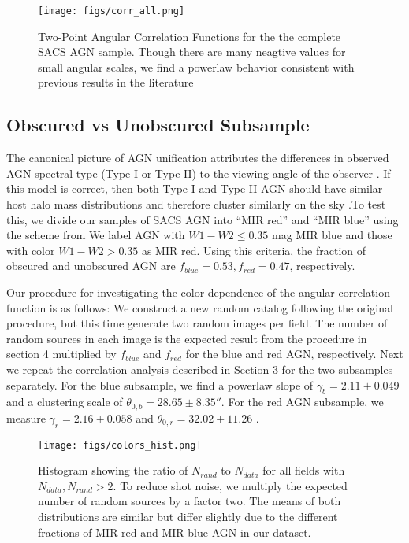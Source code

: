 \documentclass[preprint]{aastex63}
\begin{document}
\begin{figure}[!h]
    \centering
    \texttt{[image: figs/corr\_all.png]}
    \label{fig:corr_all}
    \caption{Two-Point Angular Correlation Functions for the the complete SACS AGN sample. Though there are many
    neagtive values for small angular scales, we find a powerlaw behavior consistent with 
    previous results in the literature }
\end{figure}

\subsection{Obscured vs Unobscured Subsample}
The canonical picture of AGN unification attributes the differences in observed AGN spectral type (Type I or Type II)
to the viewing angle of the observer \citep{antonucci:1985}. If this model is correct, then both Type I and Type II AGN should 
have similar host halo mass distributions and therefore cluster similarly on the sky \citep{mitra:2018}.To test this, we divide our 
samples of SACS AGN into ``MIR red'' and ``MIR blue'' using the scheme from \cite{dai_2015}
We label AGN with $W1 - W2 \leq 0.35$ mag MIR blue and those with color $W1 - W2 > 0.35$  as MIR red. Using this criteria, the fraction of obscured 
and unobscured AGN are $f_{blue} = 0.53 , f_{red} = 0.47 $, respectively.

Our procedure for investigating the color dependence of the angular correlation function is as follows:
We construct a new random catalog following the original procedure, but this time generate two random images per field. The number of random sources in each image
is the expected result from the procedure in section 4 multiplied by $f_{blue}$ and $f_{red}$ for the blue and red AGN, respectively. Next we repeat the correlation analysis
described in Section 3 for the two subsamples separately. For the blue subsample, we find a powerlaw slope of $\gamma_b = 2.11 \pm 0.049$ and a clustering scale of $\theta_{0,b} = 28.65 \pm 8.35'' $. For the 
red AGN subsample, we measure $\gamma_r = 2.16 \pm 0.058 $ and $\theta_{0,r} = 32.02 \pm 11.26$ .

\begin{figure}[!h]
    \centering
    \texttt{[image: figs/colors\_hist.png]}
    \label{fig:hist_color}
    \caption{Histogram showing the ratio of $N_{rand}$ to $N_{data}$ for all fields with $N_{data},N_{rand}> 2$. To reduce shot noise, we multiply
    the expected number of random sources by a factor  two. The means of both distributions are similar but differ slightly due to the different fractions
    of MIR red and MIR blue AGN in our dataset.  }
\end{figure}
\end{document}
